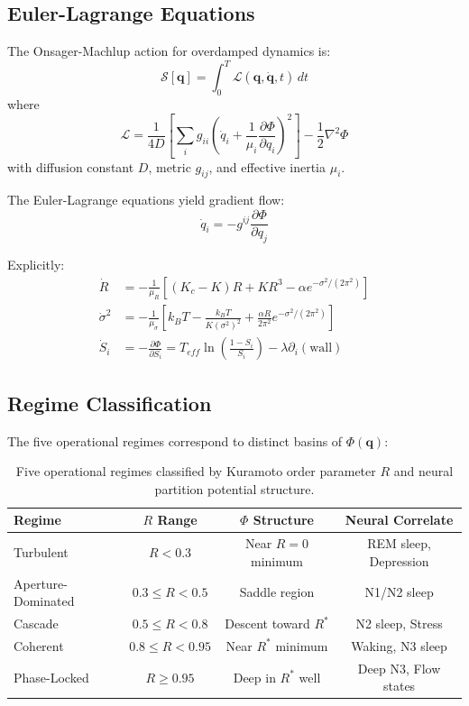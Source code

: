 \documentclass[12pt,a4paper]{article}
\begin{document}
\subsection{Euler-Lagrange Equations}

The Onsager-Machlup action for overdamped dynamics is:
\begin{equation}
\mathcal{S}[\mathbf{q}] = \int_0^T \mathcal{L}(\mathbf{q}, \dot{\mathbf{q}}, t) \, dt
\end{equation}
where
\begin{equation}
\mathcal{L} = \frac{1}{4D} \left[ \sum_i g_{ii} \left( \dot{q}_i + \frac{1}{\mu_i} \frac{\partial \Phi}{\partial q_i} \right)^2 \right] - \frac{1}{2} \nabla^2 \Phi
\end{equation}
with diffusion constant $D$, metric $g_{ij}$, and effective inertia $\mu_i$.

The Euler-Lagrange equations yield gradient flow:
\begin{equation}
\dot{q}_i = -g^{ij} \frac{\partial \Phi}{\partial q_j}
\end{equation}

Explicitly:
\begin{align}
\dot{R} &= -\frac{1}{\mu_R} \left[ (K_c - K)R + KR^3 - \alpha e^{-\sigma^2/(2\pi^2)} \right] \\
\dot{\sigma}^2 &= -\frac{1}{\mu_\sigma} \left[ k_B T - \frac{k_B T}{K(\sigma^2)^2} + \frac{\alpha R}{2\pi^2} e^{-\sigma^2/(2\pi^2)} \right] \\
\dot{S}_i &= -\frac{\partial \Phi}{\partial S_i} = T_{eff} \ln\left( \frac{1-S_i}{S_i} \right) - \lambda \partial_i(\text{wall})
\end{align}

\subsection{Regime Classification}

The five operational regimes correspond to distinct basins of $\Phi(\mathbf{q})$:

\begin{table}[h]
\centering
\begin{tabular}{lccc}
\toprule
\textbf{Regime} & \textbf{$R$ Range} & \textbf{$\Phi$ Structure} & \textbf{Neural Correlate} \\
\midrule
Turbulent & $R < 0.3$ & Near $R=0$ minimum & REM sleep, Depression \\
Aperture-Dominated & $0.3 \leq R < 0.5$ & Saddle region & N1/N2 sleep \\
Cascade & $0.5 \leq R < 0.8$ & Descent toward $R^*$ & N2 sleep, Stress \\
Coherent & $0.8 \leq R < 0.95$ & Near $R^*$ minimum & Waking, N3 sleep \\
Phase-Locked & $R \geq 0.95$ & Deep in $R^*$ well & Deep N3, Flow states \\
\bottomrule
\end{tabular}
\caption{Five operational regimes classified by Kuramoto order parameter $R$ and neural partition potential structure.}
\label{tab:regimes}
\end{table}
\end{document}
